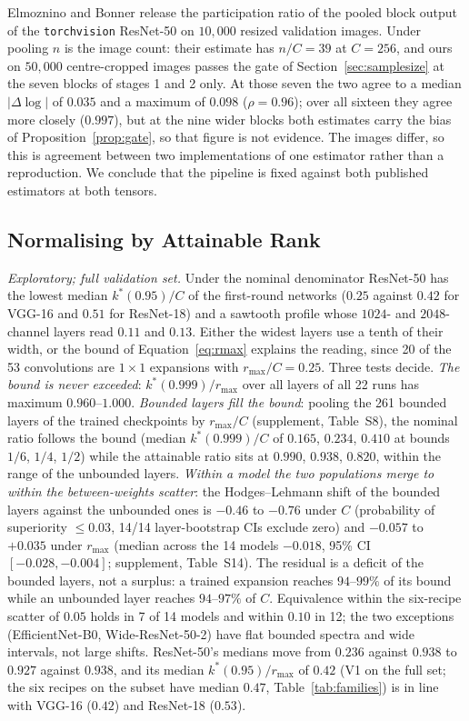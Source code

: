 \documentclass[10pt,journal,compsoc]{IEEEtran}
\begin{document}
Elmoznino and Bonner \cite{elmoznino2024highDim} release the participation
ratio of the pooled block output of the \texttt{torchvision} ResNet-50 on
$10{,}000$ resized validation images. Under pooling $n$ is the image
count: their estimate has $n/C = 39$ at $C = 256$, and ours on $50{,}000$
centre-cropped images passes the gate of Section~\ref{sec:samplesize} at
the seven blocks of stages 1 and 2 only. At those seven the two agree to a
median $|\Delta \log|$ of $0.035$ and a maximum of $0.098$
($\rho = 0.96$); over all sixteen they agree more closely ($0.997$), but
at the nine wider blocks both estimates carry the bias of
Proposition~\ref{prop:gate}, so that figure is not evidence. The images
differ, so this is agreement between two implementations of one estimator
rather than a reproduction. We conclude that the pipeline is fixed against
both published estimators at both tensors.

\subsection{Normalising by Attainable Rank}
\label{sec:rmax}

\emph{Exploratory; full validation set.} Under the nominal denominator
ResNet-50 has the lowest median $k^*(0.95)/C$ of the first-round networks
($0.25$ against $0.42$ for VGG-16 and $0.51$ for ResNet-18) and a sawtooth
profile whose $1024$- and $2048$-channel layers read $0.11$ and $0.13$.
Either the widest layers use a tenth of their width, or the bound of
Equation~\eqref{eq:rmax} explains the reading, since 20 of the 53
convolutions are $1\!\times\!1$ expansions with $r_{\max}/C = 0.25$.
Three tests decide. \emph{The bound is never exceeded}:
$k^*(0.999)/r_{\max}$ over all layers of all 22 runs has maximum
$0.960$--$1.000$. \emph{Bounded layers fill the bound}:
pooling the 261 bounded layers of the trained checkpoints by $r_{\max}/C$
(supplement, Table~S8), the nominal ratio follows the bound (median
$k^*(0.999)/C$ of $0.165$, $0.234$, $0.410$ at bounds $1/6$, $1/4$, $1/2$)
while the attainable ratio sits at $0.990$, $0.938$, $0.820$, within the
range of the unbounded layers. \emph{Within a model the two populations
merge to within the between-weights scatter}: the Hodges--Lehmann shift of
the bounded layers against the unbounded ones is $-0.46$ to $-0.76$ under
$C$ (probability of superiority $\le 0.03$, 14/14 layer-bootstrap CIs
exclude zero) and $-0.057$ to $+0.035$ under $r_{\max}$ (median across the
14 models $-0.018$, 95\% CI $[-0.028, -0.004]$; supplement, Table~S14).
The residual is a deficit of the bounded layers, not a surplus: a trained
expansion reaches $94$--$99\%$ of its bound while an unbounded layer
reaches $94$--$97\%$ of $C$. Equivalence within the six-recipe scatter of
$0.05$ holds in 7 of 14 models and within $0.10$ in 12; the two exceptions
(EfficientNet-B0, Wide-ResNet-50-2) have flat bounded spectra and wide
intervals, not large shifts. ResNet-50's medians move from $0.236$ against
$0.938$ to $0.927$ against $0.938$, and its median $k^*(0.95)/r_{\max}$
of $0.42$ (V1 on the full set; the six recipes on the subset have median
$0.47$, Table~\ref{tab:families}) is in line with VGG-16 ($0.42$) and
ResNet-18 ($0.53$).
\end{document}
